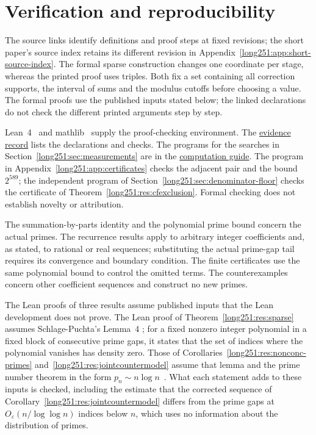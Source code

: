 \section{Verification and reproducibility}\label{long251:app:index}
\evidenceparagraph{\evidencerecordurl}
The source links identify definitions and proof steps at fixed revisions;
the short paper's source index retains its different revision in
Appendix~\ref{long251:app:short-source-index}. The formal sparse
construction changes one coordinate per stage, whereas the printed
proof uses triples. Both fix a set containing all correction supports,
the interval of sums and the modulus cutoffs before choosing a value. The formal proofs use the
published inputs stated below; the linked declarations do not check
the different printed arguments step by step.

Lean~4~\cite{lean4} and mathlib~\cite{mathlib} supply the proof-checking
environment. The \href{\evidencerecordurl}{evidence record} lists the
declarations and checks. The programs for the searches in
Section~\ref{long251:sec:measurements} are in the
\href{https://github.com/wcook04/plectis-erdos/blob/dd6cc708f650f061de06594eba6ba43878f4de31/research/experiments/erdos251/README.md}{computation guide}.
The program in Appendix~\ref{long251:app:certificates} checks the
adjacent pair and the bound $2^{589}$; the independent program of
Section~\ref{long251:sec:denominator-floor} checks the certificate of
Theorem~\ref{long251:res:cfexclusion}. Formal checking does not
establish novelty or attribution.

The summation-by-parts identity and the polynomial prime bound concern the
actual primes.  The recurrence results apply to arbitrary integer
coefficients and, as stated, to rational or real sequences; substituting
the actual prime-gap tail requires its convergence and boundary condition.
The finite certificates use the same polynomial bound to control the
omitted terms.  The counterexamples concern other coefficient sequences
and construct no new primes.

The Lean proofs of three results assume published inputs that the Lean
development does not prove.  The Lean proof of
Theorem~\ref{long251:res:sparse} assumes Schlage-Puchta's
Lemma~4 \cite[Lemma~4, pp.~5--6]{schlagepuchta2011}; for a fixed nonzero
integer polynomial in a fixed block of consecutive prime gaps, it states
that the set of indices where the polynomial vanishes has density zero.
Those of Corollaries~\ref{long251:res:nonconc-primes}
and~\ref{long251:res:jointcountermodel} assume that lemma and the prime
number theorem in the form $p_n\sim n\log n$~\cite[Chapter~6]{mv2007}.
What each statement adds to these inputs is checked, including the
estimate that the corrected sequence of
Corollary~\ref{long251:res:jointcountermodel} differs from the prime gaps
at $O_\varepsilon(n/\log\log n)$ indices below $n$, which uses no
information about the distribution of primes.


